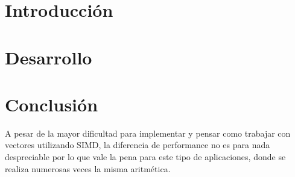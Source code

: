 \documentclass[10pt, a4paper]{article}
\begin{document}
 

    \maketitle

    \tableofcontents

    \pagestyle{fancy}

    \newpage

    \section{Introducción}

    \section{Desarrollo}
    
         \newpage
         \newpage
         \newpage
         \newpage
         \newpage
         \newpage
         \newpage


    \section{Conclusión}
    
        A pesar de la mayor dificultad para implementar y pensar como trabajar con vectores utilizando SIMD, la diferencia de performance no es para nada despreciable por lo que vale la pena para este tipo de aplicaciones, donde se realiza numerosas veces la misma aritmética.
        
\end{document}
